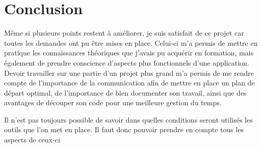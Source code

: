 \section{Conclusion}
\vspace{1cm}

Même si plusieurs points restent à améliorer, je suis satisfait de ce projet car toutes les demandes ont pu être mises en place. 
Celui-ci m’a permis de mettre en pratique les connaissances théoriques que j’avais pu acquérir en formation, mais également de prendre conscience d’aspects plus fonctionnels d’une application.\\

Devoir travailler sur une partie d’un projet plus grand m’a permis de me rendre compte de l’importance de la communication afin de mettre en place un plan de départ optimal, de l’importance de bien documenter son travail, ainsi que des avantages de découper son code pour une meilleure gestion du temps.

Il n’est pas toujours possible de savoir dans quelles conditions seront utilisés les outils que l’on met en place. Il faut donc pouvoir prendre en compte tous les aspects de ceux-ci